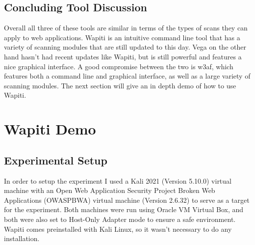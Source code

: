 \subsection{Concluding Tool Discussion}
\quad \quad Overall all three of these tools are similar in terms of the types of scans they can apply to web applications. Wapiti is an intuitive command line tool that 
has a variety of scanning modules that are still updated to this day. 
Vega on the other hand hasn't had recent updates like Wapiti, but is still powerful and features a nice graphical 
interface. A good compromise between the two is w3af, which features both a command line and graphical interface, as well
as a large variety of scanning modules. The next section will give an in depth demo of how to use Wapiti.
\section{Wapiti Demo} \label{sec:demo}
\subsection{Experimental Setup}
In order to setup the experiment I used a Kali 2021 (Version 5.10.0) virtual machine with an Open Web Application Security Project Broken Web Applications (OWASPBWA)
virtual machine (Version 2.6.32) to serve as a target for the experiment. Both machines were run using 
Oracle VM Virtual Box, and both were also set to Host-Only Adapter mode to ensure a safe environment.
Wapiti comes preinstalled with Kali Linux, so it wasn't necessary to do any installation.
